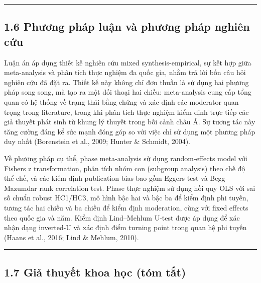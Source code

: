 \documentclass[12pt,a4paper]{article}
\begin{document}
\begin{center}\rule{0.5\linewidth}{0.5pt}\end{center}

\hypertarget{16-phux1b0ux1a1ng-phuxe1p-luux1eadn-vuxe0-phux1b0ux1a1ng-phuxe1p-nghiuxean-cux1ee9u}{%
\subsection{1.6 Phương pháp luận và phương pháp nghiên
cứu}\label{16-phux1b0ux1a1ng-phuxe1p-luux1eadn-vuxe0-phux1b0ux1a1ng-phuxe1p-nghiuxean-cux1ee9u}}

Luận án áp dụng thiết kế nghiên cứu mixed synthesis-empirical, sự kết
hợp giữa meta-analysis và phân tích thực nghiệm đa quốc gia, nhằm trả
lời bốn câu hỏi nghiên cứu đã đặt ra. Thiết kế này không chỉ đơn thuần
là sử dụng hai phương pháp song song, mà tạo ra một đối thoại hai chiều:
meta-analysis cung cấp tổng quan có hệ thống về trạng thái bằng chứng và
xác định các moderator quan trọng trong literature, trong khi phân tích
thực nghiệm kiểm định trực tiếp các giả thuyết phát sinh từ khung lý
thuyết trong bối cảnh châu Á. Sự tương tác này tăng cường đáng kể sức
mạnh đóng góp so với việc chỉ sử dụng một phương pháp duy nhất
(Borenstein et al., 2009; Hunter \& Schmidt, 2004).

Về phương pháp cụ thể, phase meta-analysis sử dụng random-effects model
với Fisher\textquotesingle s z transformation, phân tích nhóm con
(subgroup analysis) theo chế độ thể chế, và các kiểm định publication
bias bao gồm Egger\textquotesingle s test và Begg--Mazumdar rank
correlation test. Phase thực nghiệm sử dụng hồi quy OLS với sai số chuẩn
robust HC1/HC3, mô hình bậc hai và bậc ba để kiểm định phi tuyến, tương
tác hai chiều và ba chiều để kiểm định moderation, cùng với fixed
effects theo quốc gia và năm. Kiểm định Lind--Mehlum U-test được áp dụng
để xác nhận dạng inverted-U và xác định điểm turning point trong quan hệ
phi tuyến (Haans et al., 2016; Lind \& Mehlum, 2010).

\begin{center}\rule{0.5\linewidth}{0.5pt}\end{center}

\hypertarget{17-giux1ea3-thuyux1ebft-khoa-hux1ecdc-tuxf3m-tux1eaft}{%
\subsection{1.7 Giả thuyết khoa học (tóm
tắt)}\label{17-giux1ea3-thuyux1ebft-khoa-hux1ecdc-tuxf3m-tux1eaft}}
\end{document}
